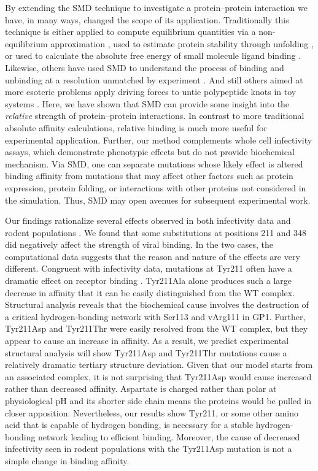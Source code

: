 \documentclass[12pt]{article}
\begin{document}
By extending the SMD technique to investigate a protein--protein interaction we have, in many ways, changed the scope of its application. Traditionally this technique is either applied to compute equilibrium quantities via a non-equilibrium approximation \citep{Park2003,Park2004,Buch2011,Giorgino2012}, used to estimate protein stability through unfolding \citep{Lu1999}, or used to calculate the absolute free energy of small molecule ligand binding \citep{Dixit2001}. Likewise, others have used SMD to understand the process of binding and unbinding at a resolution unmatched by experiment \citep{Cuendet2011,Giorgino2012}. And still others aimed at more esoteric problems apply driving forces to untie polypeptide knots in toy systems \citep{Sulkowska2010}. Here, we have shown that SMD can provide some insight into the \textit{relative} strength of protein--protein interactions. In contrast to more traditional absolute affinity calculations, relative binding is much more useful for experimental application. Further, our method complements whole cell infectivity assays, which demonstrate phenotypic effects but do not provide biochemical mechanism. Via SMD, one can separate mutations whose likely effect is altered binding affinity from mutations that may affect other factors such as protein expression, protein folding, or interactions with other proteins not considered in the simulation. Thus, SMD may open avenues for subsequent experimental work.

Our findings rationalize several effects observed in both infectivity data and rodent populations \citep{Rad2008,Rad20111}. We found that some substitutions at positions 211 and 348 did negatively affect the strength of viral binding. In the two cases, the computational data suggests that the reason and nature of the effects are very different. Congruent with infectivity data, mutations at Tyr211 often have a dramatic effect on receptor binding \citep{Rad2008,Rad20111}. Tyr211Ala alone produces such a large decrease in affinity that it can be easily distinguished from the WT complex. Structural analysis reveals that the biochemical cause involves the destruction of a critical hydrogen-bonding network with Ser113 and vArg111 in GP1. Further, Tyr211Asp and Tyr211Thr were easily resolved from the WT complex, but they appear to cause an increase in affinity. As a result, we predict experimental structural analysis will show Tyr211Asp and Tyr211Thr mutations cause a relatively dramatic tertiary structure deviation. Given that our model starts from an associated complex, it is not surprising that Tyr211Asp would cause increased rather than decreased affinity. Aspartate is charged rather than polar at physiological pH and its shorter side chain means the proteins would be pulled in closer apposition. Nevertheless, our results show Tyr211, or some other amino acid that is capable of hydrogen bonding, is necessary for a stable hydrogen-bonding network leading to efficient binding. Moreover, the cause of decreased infectivity seen in rodent populations with the Tyr211Asp mutation is not a simple change in binding affinity.
\end{document}

